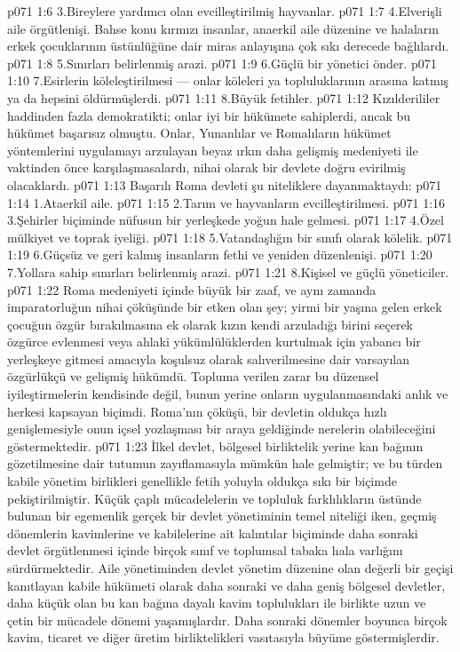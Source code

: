 \vs p071 1:6 3.\bibnobreakspace Bireylere yardımcı olan evcilleştirilmiş hayvanlar.
\vs p071 1:7 4.\bibnobreakspace Elverişli aile örgütlenişi. Bahse konu kırmızı insanlar, anaerkil aile düzenine ve halaların erkek çocuklarının üstünlüğüne dair miras anlayışına çok sıkı derecede bağlılardı.
\vs p071 1:8 5.\bibnobreakspace Sınırları belirlenmiş arazi.
\vs p071 1:9 6.\bibnobreakspace Güçlü bir yönetici önder.
\vs p071 1:10 7.\bibnobreakspace Esirlerin köleleştirilmesi --- onlar köleleri ya topluluklarının arasına katmış ya da hepsini öldürmüşlerdi.
\vs p071 1:11 8.\bibnobreakspace Büyük fetihler.
\vs p071 1:12 Kızılderililer haddinden fazla demokratikti; onlar iyi bir hükümete sahiplerdi, ancak bu hükümet başarısız olmuştu. Onlar, Yunanlılar ve Romalıların hükümet yöntemlerini uygulamayı arzulayan beyaz ırkın daha gelişmiş medeniyeti ile vaktinden önce karşılaşmasalardı, nihai olarak bir devlete doğru evirilmiş olacaklardı.
\vs p071 1:13 Başarılı Roma devleti şu niteliklere dayanmaktaydı:
\vs p071 1:14 1.\bibnobreakspace Ataerkil aile.
\vs p071 1:15 2.\bibnobreakspace Tarım ve hayvanların evcilleştirilmesi.
\vs p071 1:16 3.\bibnobreakspace Şehirler biçiminde nüfusun bir yerleşkede yoğun hale gelmesi.
\vs p071 1:17 4.\bibnobreakspace Özel mülkiyet ve toprak iyeliği.
\vs p071 1:18 5.\bibnobreakspace Vatandaşlığın bir sınıfı olarak kölelik.
\vs p071 1:19 6.\bibnobreakspace Güçsüz ve geri kalmış insanların fethi ve yeniden düzenlenişi.
\vs p071 1:20 7.\bibnobreakspace Yollara sahip sınırları belirlenmiş arazi.
\vs p071 1:21 8.\bibnobreakspace Kişisel ve güçlü yöneticiler.
\vs p071 1:22 Roma medeniyeti içinde büyük bir zaaf, ve aynı zamanda imparatorluğun nihai çöküşünde bir etken olan şey; yirmi bir yaşına gelen erkek çocuğun özgür bırakılmasına ek olarak kızın kendi arzuladığı birini seçerek özgürce evlenmesi veya ahlaki yükümlülüklerden kurtulmak için yabancı bir yerleşkeye gitmesi amacıyla koşulsuz olarak salıverilmesine dair varsayılan özgürlükçü ve gelişmiş hükümdü. Topluma verilen zarar bu düzensel iyileştirmelerin kendisinde değil, bunun yerine onların uygulanmasındaki anlık ve herkesi kapsayan biçimdi. Roma’nın çöküşü, bir devletin oldukça hızlı genişlemesiyle onun içsel yozlaşması bir araya geldiğinde nerelerin olabileceğini göstermektedir.
\vs p071 1:23 İlkel devlet, bölgesel birliktelik yerine kan bağının gözetilmesine dair tutumun zayıflamasıyla mümkün hale gelmiştir; ve bu türden kabile yönetim birlikleri genellikle fetih yoluyla oldukça sıkı bir biçimde pekiştirilmiştir. Küçük çaplı mücadelelerin ve topluluk farklılıkların üstünde bulunan bir egemenlik gerçek bir devlet yönetiminin temel niteliği iken, geçmiş dönemlerin kavimlerine ve kabilelerine ait kalıntılar biçiminde daha sonraki devlet örgütlenmesi içinde birçok sınıf ve toplumsal tabaka hala varlığını sürdürmektedir. Aile yönetiminden devlet yönetim düzenine olan değerli bir geçişi kanıtlayan kabile hükümeti olarak daha sonraki ve daha geniş bölgesel devletler, daha küçük olan bu kan bağına dayalı kavim toplulukları ile birlikte uzun ve çetin bir mücadele dönemi yaşamışlardır. Daha sonraki dönemler boyunca birçok kavim, ticaret ve diğer üretim birliktelikleri vasıtasıyla büyüme göstermişlerdir.
